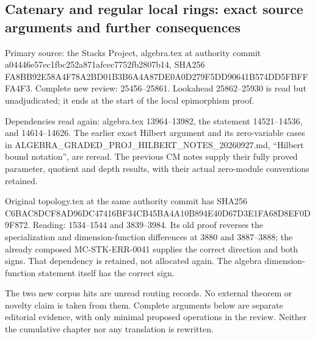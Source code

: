 \subsection{Catenary and regular local rings: exact source arguments and further consequences}\label{algebra-proof-020-catenary-and-regular-local-rings-exact-source-arguments-and-further-consequences}

Primary source: the Stacks Project, algebra.tex at authority commit a044\allowbreak{}46e5\allowbreak{}7ec1\allowbreak{}fbc2\allowbreak{}52a8\allowbreak{}71af\allowbreak{}cec7\allowbreak{}752f\allowbreak{}b280\allowbreak{}7b14, SHA256 FA8B\allowbreak{}B92E\allowbreak{}58A4\allowbreak{}F78A\allowbreak{}2BD0\allowbreak{}1B3B\allowbreak{}6A4A\allowbreak{}87DE\allowbreak{}0A0D\allowbreak{}279F\allowbreak{}5DD9\allowbreak{}0641\allowbreak{}B574\allowbreak{}DD5F\allowbreak{}BFFF\allowbreak{}A4F3. Complete new review: 25456--25861. Lookahead 25862--25930 is read but unadjudicated; it ends at the start of the local epimorphism proof.

Dependencies read again: algebra.tex 13964--13982, the statement 14521--14536, and 14614--14626. The earlier exact Hilbert argument and its zero-variable cases in ALGEBRA\_\allowbreak{}GRADED\_\allowbreak{}PROJ\_\allowbreak{}HILBERT\_\allowbreak{}NOTES\_\allowbreak{}20260927.\allowbreak{}md, ``Hilbert bound notation'', are reread. The previous CM notes supply their fully proved parameter, quotient and depth results, with their actual zero-module conventions retained.

Original topology.tex at the same authority commit has SHA256 C6BA\allowbreak{}C8DC\allowbreak{}F8AD\allowbreak{}96DC\allowbreak{}4741\allowbreak{}6BF3\allowbreak{}4CB4\allowbreak{}5BA4\allowbreak{}A10B\allowbreak{}894E\allowbreak{}40D6\allowbreak{}7D3E\allowbreak{}1FA6\allowbreak{}8D8E\allowbreak{}F0D9\allowbreak{}F872. Reading: 1534--1544 and 3839--3984. Its old proof reverses the specialization and dimension-function differences at 3880 and 3887--3888; the already composed MC-\AlgebraIdentifierBreak{}STK-\AlgebraIdentifierBreak{}ERR-\AlgebraIdentifierBreak{}0041 supplies the correct direction and both signs. That dependency is retained, not allocated again. The algebra dimension-function statement itself has the correct sign.

The two new corpus hits are unread routing records. No external theorem or novelty claim is taken from them. Complete arguments below are separate editorial evidence, with only minimal proposed operations in the review. Neither the cumulative chapter nor any translation is rewritten.

